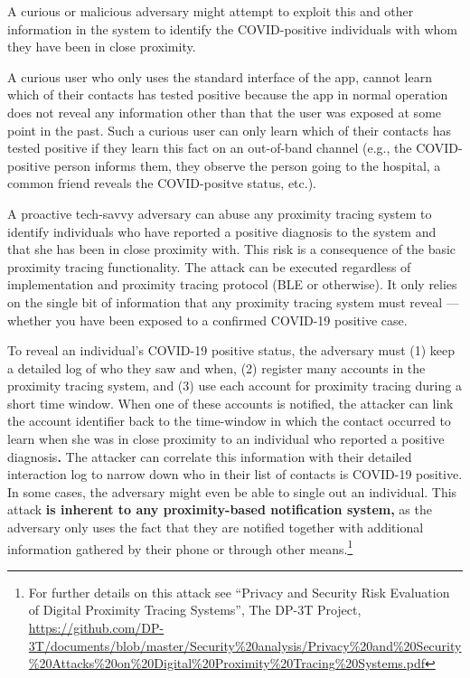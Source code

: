 \documentclass{article}
\begin{document}
A curious or malicious adversary might attempt to exploit this and other
information in the system to identify the COVID-positive individuals
with whom they have been in close proximity.

A curious user who only uses the standard interface of the app, cannot
learn which of their contacts has tested positive because the app in
normal operation does not reveal any information other than that the
user was exposed at some point in the past. Such a curious user can only
learn which of their contacts has tested positive if they learn this
fact on an out-of-band channel (e.g., the COVID-positive person informs
them, they observe the person going to the hospital, a common friend
reveals the COVID-positve status, etc.).

A proactive tech-savvy adversary can abuse any proximity tracing system
to identify individuals who have reported a positive diagnosis to the
system and that she has been in close proximity with. This risk is a
consequence of the basic proximity tracing functionality. The attack can
be executed regardless of implementation and proximity tracing protocol
(BLE or otherwise). It only relies on the single bit of information that
any proximity tracing system must reveal --- whether you have been
exposed to a confirmed COVID-19 positive case.

To reveal an individual's COVID-19 positive status, the adversary must
(1) keep a detailed log of who they saw and when, (2) register many
accounts in the proximity tracing system, and (3) use each account for
proximity tracing during a short time window. When one of these accounts
is notified, the attacker can link the account identifier back to the
time-window in which the contact occurred to learn when she was in close
proximity to an individual who reported a positive diagnosis\textbf{.}
The attacker can correlate this information with their detailed
interaction log to narrow down who in their list of contacts is COVID-19
positive. In some cases, the adversary might even be able to single out
an individual. This attack \textbf{is inherent to any proximity-based
notification system,} as the adversary only uses the fact that they are
notified together with additional information gathered by their phone or
through other means.\footnote{For further details on this attack see
  ``Privacy and Security Risk Evaluation of Digital Proximity Tracing
  Systems'', The DP-3T Project,
  \href{https://github.com/DP-3T/documents/blob/master/Security\%20analysis/Privacy\%20and\%20Security\%20Attacks\%20on\%20Digital\%20Proximity\%20Tracing\%20Systems.pdf}{{https://github.com/DP-3T/documents/blob/master/Security\%20analysis/Privacy\%20and\%20Security\%20Attacks\%20on\%20Digital\%20Proximity\%20Tracing\%20Systems.pdf}}}
\end{document}
